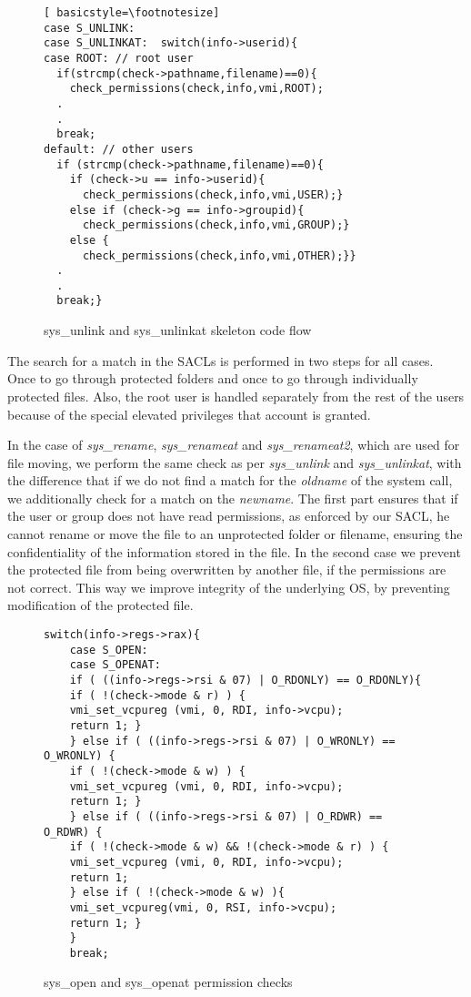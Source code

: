 \begin{figure}[ht]
\centering
\begin{lstlisting}[ basicstyle=\footnotesize]
case S_UNLINK:          
case S_UNLINKAT:  switch(info->userid){
case ROOT: // root user
  if(strcmp(check->pathname,filename)==0){
	check_permissions(check,info,vmi,ROOT);			
  .
  .
  break;
default: // other users
  if (strcmp(check->pathname,filename)==0){
	if (check->u == info->userid){
	  check_permissions(check,info,vmi,USER);}
	else if (check->g == info->groupid){
	  check_permissions(check,info,vmi,GROUP);}
	else {
	  check_permissions(check,info,vmi,OTHER);}}
  .
  .
  break;}
\end{lstlisting}
\caption{sys\_unlink and sys\_unlinkat skeleton code flow}
\label{fig:unlink}
\end{figure}

\par The search for a match in the \ac{SACL}s is performed in two steps for all cases. Once to go through protected folders and once to go through individually protected files. Also, the root user is handled separately from the rest of the users because of the special elevated privileges that account is granted. 

\par In the case of \textit{sys\_rename}, \textit{sys\_renameat} and \textit{sys\_renameat2}, which are used for file moving, we perform the same check as per \textit{sys\_unlink} and \textit{sys\_unlinkat}, with the difference that if we do not find a match for the \textit{oldname} of the system call, we additionally check for a match on the \textit{newname}. The first part ensures that if the user or group does not have read permissions, as enforced by our \ac{SACL}, he cannot rename or move the file to an unprotected folder or filename, ensuring the confidentiality of the information stored in the file. In the second case we prevent the protected file from being overwritten by another file, if the permissions are not correct. This way we improve integrity of the underlying \ac{OS}, by preventing modification of the protected file. 
\begin{figure}[ht]
	\centering
	\begin{lstlisting}[basicstyle=\footnotesize]
	switch(info->regs->rax){
	case S_OPEN:
	case S_OPENAT:
	if ( ((info->regs->rsi & 07) | O_RDONLY) == O_RDONLY){
	if ( !(check->mode & r) ) {
	vmi_set_vcpureg (vmi, 0, RDI, info->vcpu);
	return 1; }
	} else if ( ((info->regs->rsi & 07) | O_WRONLY) == O_WRONLY) {
	if ( !(check->mode & w) ) {
	vmi_set_vcpureg (vmi, 0, RDI, info->vcpu);
	return 1; }
	} else if ( ((info->regs->rsi & 07) | O_RDWR) == O_RDWR) {
	if ( !(check->mode & w) && !(check->mode & r) ) {
	vmi_set_vcpureg (vmi, 0, RDI, info->vcpu);
	return 1;
	} else if ( !(check->mode & w) ){
	vmi_set_vcpureg(vmi, 0, RSI, info->vcpu);
	return 1; }
	}
	break;
	\end{lstlisting}
	\caption{sys\_open and sys\_openat permission checks}
	\label{fig:open}
\end{figure}

